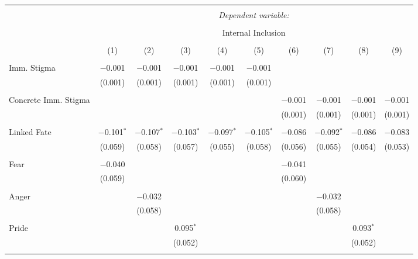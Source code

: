 
\begin{table}[!htbp] \centering 
  \caption{} 
  \label{} 
\begin{tabular}{@{\extracolsep{5pt}}lccccccccc} 
\\[-1.8ex]\hline 
\hline \\[-1.8ex] 
 & \multicolumn{9}{c}{\textit{Dependent variable:}} \\ 
\cline{2-10} 
\\[-1.8ex] & \multicolumn{9}{c}{Internal Inclusion} \\ 
\\[-1.8ex] & (1) & (2) & (3) & (4) & (5) & (6) & (7) & (8) & (9)\\ 
\hline \\[-1.8ex] 
 Imm. Stigma & $-$0.001 & $-$0.001 & $-$0.001 & $-$0.001 & $-$0.001 &  &  &  &  \\ 
  & (0.001) & (0.001) & (0.001) & (0.001) & (0.001) &  &  &  &  \\ 
  & & & & & & & & & \\ 
 Concrete Imm. Stigma &  &  &  &  &  & $-$0.001 & $-$0.001 & $-$0.001 & $-$0.001 \\ 
  &  &  &  &  &  & (0.001) & (0.001) & (0.001) & (0.001) \\ 
  & & & & & & & & & \\ 
 Linked Fate & $-$0.101$^{*}$ & $-$0.107$^{*}$ & $-$0.103$^{*}$ & $-$0.097$^{*}$ & $-$0.105$^{*}$ & $-$0.086 & $-$0.092$^{*}$ & $-$0.086 & $-$0.083 \\ 
  & (0.059) & (0.058) & (0.057) & (0.055) & (0.058) & (0.056) & (0.055) & (0.054) & (0.053) \\ 
  & & & & & & & & & \\ 
 Fear & $-$0.040 &  &  &  &  & $-$0.041 &  &  &  \\ 
  & (0.059) &  &  &  &  & (0.060) &  &  &  \\ 
  & & & & & & & & & \\ 
 Anger &  & $-$0.032 &  &  &  &  & $-$0.032 &  &  \\ 
  &  & (0.058) &  &  &  &  & (0.058) &  &  \\ 
  & & & & & & & & & \\ 
 Pride &  &  & 0.095$^{*}$ &  &  &  &  & 0.093$^{*}$ &  \\ 
  &  &  & (0.052) &  &  &  &  & (0.052) &  \\ 
  & & & & & & & & & \\ 

\end{tabular}
\end{table}
